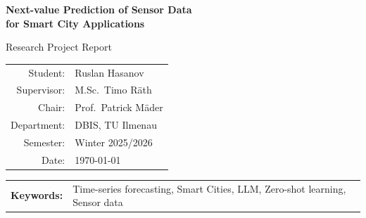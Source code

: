 \documentclass[11pt,a4paper]{article}
\begin{document}

\begin{titlepage}
\centering
\vspace*{2cm}
{\LARGE\bfseries Next-value Prediction of Sensor Data\\[6pt]
for Smart City Applications\par}
\vspace{1cm}
{\large Research Project Report\par}
\vspace{2cm}
\begin{tabular}{r l}
Student:    & Ruslan Hasanov \\[4pt]
Supervisor: & M.Sc.\ Timo R\"ath \\[4pt]
Chair:      & Prof.\ Patrick M\"ader \\[4pt]
Department: & DBIS, TU Ilmenau \\[4pt]
Semester:   & Winter 2025/2026 \\[4pt]
Date:       & \today \\
\end{tabular}
\vspace{1.5cm}
\begin{tabular}{l p{}}
\textbf{Keywords:} &
Time-series forecasting, Smart Cities, LLM, Zero-shot learning, Sensor data \\
\end{tabular}
\end{titlepage}
\end{document}

